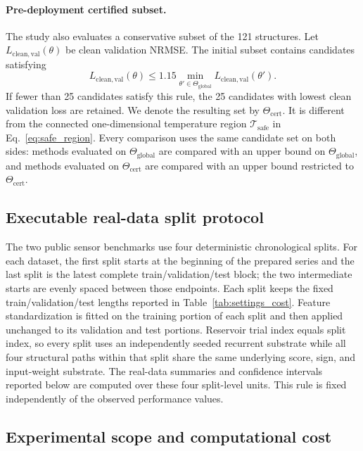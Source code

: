 \documentclass[preprint,12pt,authoryear]{elsarticle}
\begin{document}
\paragraph{Pre-deployment certified subset.}
The study also evaluates a conservative subset of the 121 structures. Let $L_{\mathrm{clean,val}}(\theta)$ be clean validation NRMSE. The initial subset contains candidates satisfying
\begin{equation}
  L_{\mathrm{clean,val}}(\theta)
  \le 1.15\min_{\theta'\in\Theta_{\mathrm{global}}}
  L_{\mathrm{clean,val}}(\theta').
\end{equation}
If fewer than 25 candidates satisfy this rule, the 25 candidates with lowest clean validation loss are retained. We denote the resulting set by $\Theta_{\mathrm{cert}}$. It is different from the connected one-dimensional temperature region $\mathcal T_{\mathrm{safe}}$ in Eq.~\eqref{eq:safe_region}. Every comparison uses the same candidate set on both sides: methods evaluated on $\Theta_{\mathrm{global}}$ are compared with an upper bound on $\Theta_{\mathrm{global}}$, and methods evaluated on $\Theta_{\mathrm{cert}}$ are compared with an upper bound restricted to $\Theta_{\mathrm{cert}}$.

\subsection{Executable real-data split protocol}
\label{sec:realdata_protocol}

The two public sensor benchmarks use four deterministic chronological splits. For each dataset, the first split starts at the beginning of the prepared series and the last split is the latest complete train/validation/test block; the two intermediate starts are evenly spaced between those endpoints. Each split keeps the fixed train/validation/test lengths reported in Table~\ref{tab:settings_cost}. Feature standardization is fitted on the training portion of each split and then applied unchanged to its validation and test portions. Reservoir trial index equals split index, so every split uses an independently seeded recurrent substrate while all four structural paths within that split share the same underlying score, sign, and input-weight substrate. The real-data summaries and confidence intervals reported below are computed over these four split-level units. This rule is fixed independently of the observed performance values.

\subsection{Experimental scope and computational cost}
\label{sec:scope_cost}
\end{document}
